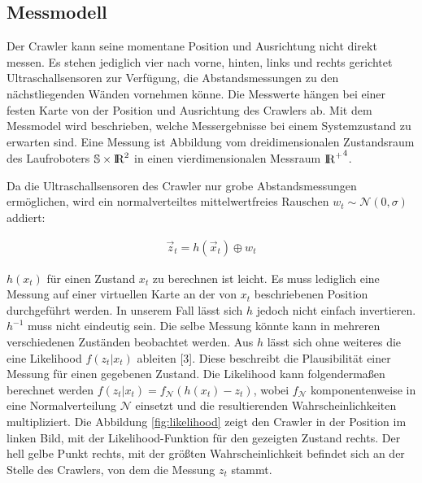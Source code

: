 \subsection{Messmodell}

Der Crawler kann seine momentane Position und Ausrichtung nicht direkt messen. Es stehen jediglich vier nach vorne, hinten, links und rechts gerichtet Ultraschallsensoren zur Verfügung, die Abstandsmessungen zu den nächstliegenden Wänden vornehmen könne. Die Messwerte hängen bei einer festen Karte von der Position und Ausrichtung des Crawlers ab. 
Mit dem Messmodel wird beschrieben, welche Messergebnisse bei einem Systemzustand zu erwarten sind. Eine Messung ist Abbildung vom dreidimensionalen Zustandsraum des Laufroboters $\mathbb{S} \times \mathrm{I\hspace{-2pt}R}^2$ in einen vierdimensionalen Messraum ${\mathrm{I\hspace{-2pt}R}^+}^4$.

Da die Ultraschallsensoren des Crawler nur grobe Abstandsmessungen ermöglichen, wird ein normalverteiltes mittelwertfreies Rauschen $w_t \sim \mathcal{N}(0,\sigma)$ addiert:

\begin{align*}
\vec{z}_{t} = h(\vec{x}_t) \oplus w_t
\end{align*}

$h(x_t)$ für einen Zustand $x_t$ zu berechnen ist leicht. Es muss lediglich eine Messung auf einer virtuellen Karte an der von $x_t$ beschriebenen Position durchgeführt werden. In unserem Fall lässt sich $h$ jedoch nicht einfach invertieren. $h^{-1}$ muss nicht eindeutig sein. Die selbe Messung könnte kann in mehreren verschiedenen Zuständen beobachtet werden.
Aus $h$ lässt sich ohne weiteres die eine Likelihood $f(z_t | x_t)$ ableiten [3]. Diese beschreibt die Plausibilität einer Messung für einen gegebenen Zustand. Die Likelihood kann folgendermaßen berechnet werden $f(z_t | x_t) = f_{\mathcal{N}}(h(x_t)  - z_t)$, wobei  $f_{\mathcal{N}}$ komponentenweise in eine Normalverteilung $\mathcal{N}$ einsetzt und die resultierenden Wahrscheinlichkeiten multipliziert. Die Abbildung \ref{fig:likelihood} zeigt den Crawler in der Position im linken Bild, mit der Likelihood-Funktion für den gezeigten Zustand rechts. Der hell gelbe Punkt rechts, mit der größten Wahrscheinlichkeit befindet sich an der Stelle des Crawlers, von dem die Messung $z_t$ stammt.

